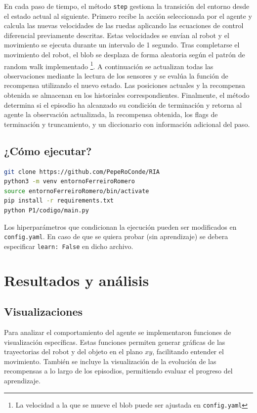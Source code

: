 \documentclass[12pt,a4paper]{article}
\begin{document}
En cada paso de tiempo, el método \texttt{step} gestiona la transición del
entorno desde el estado actual al siguiente. Primero recibe la acción
seleccionada por el agente y calcula las nuevas velocidades de las ruedas
aplicando las ecuaciones de control diferencial previamente descritas. Estas
velocidades se envían al robot y el movimiento se ejecuta durante un intervalo
de 1 segundo. Tras completarse el movimiento del robot, el blob se desplaza de
forma aleatoria según el patrón de random walk implementado \footnote{La velocidad a la que se mueve el blob puede ser ajustada en \texttt{config.yaml}}. A continuación se
actualizan todas las observaciones mediante la lectura de los sensores y se
evalúa la función de recompensa utilizando el nuevo estado. Las posiciones
actuales y la recompensa obtenida se almacenan en los historiales
correspondientes. Finalmente, el método determina si el episodio ha alcanzado su
condición de terminación y retorna al agente la observación actualizada, la
recompensa obtenida, los flags de terminación y truncamiento, y un diccionario
con información adicional del paso.

\subsection{¿Cómo ejecutar?}


\begin{lstlisting}[language=bash]
git clone https://github.com/PepeRoConde/RIA
python3 -m venv entornoFerreiroRomero
source entornoFerreiroRomero/bin/activate
pip install -r requirements.txt
python P1/codigo/main.py
\end{lstlisting}

Los hiperparámetros que condicionan la ejecución pueden ser modificados en \texttt{config.yaml}. En caso de que se quiera probar (sin aprendizaje) se debera especificar \texttt{learn: False} en dicho archivo.   

\section{Resultados y análisis}

\subsection{Visualizaciones}

Para analizar el comportamiento del agente se implementaron funciones de
visualización específicas. Estas funciones permiten generar gráficas de las
trayectorias del robot y del objeto en el plano $xy$, facilitando entender el
movimiento. También se incluye la visualización de la evolución de las
recompensas a lo largo de los episodios, permitiendo evaluar el progreso del
aprendizaje. 
\end{document}
